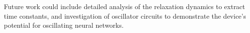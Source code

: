 \documentclass[12pt,a4paper]{article}
\begin{document}
Future work could include detailed analysis of the relaxation dynamics to extract time constants, and investigation of oscillator circuits to demonstrate the device's potential for oscillating neural networks.

\appendix


\end{document}
